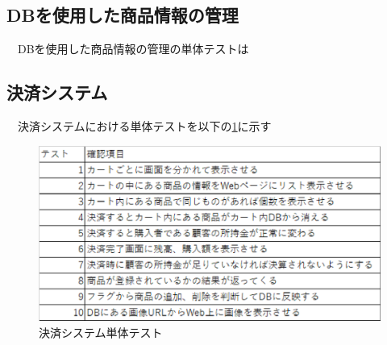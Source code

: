 \subsection*{DBを使用した商品情報の管理}
　DBを使用した商品情報の管理の単体テストは

\subsection*{決済システム}
　決済システムにおける単体テストを以下の\ref{db_test}に示す
\begin{figure}[htbp]
\centering
\includegraphics[width=12cm]{./pic/db_test.eps}
\caption{決済システム単体テスト}
\label{db_test}
\end{figure}


